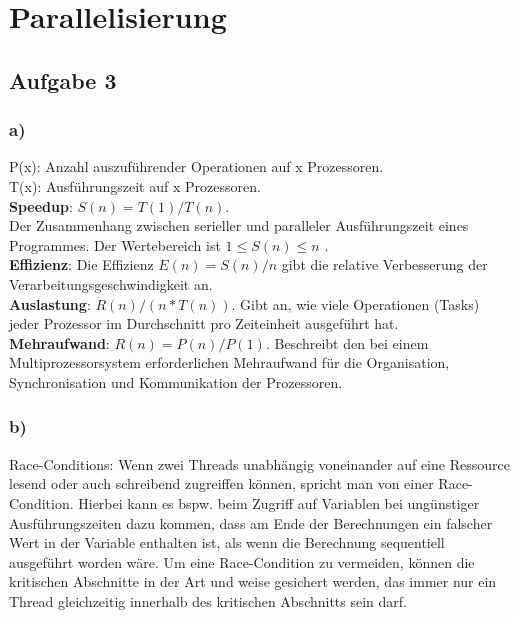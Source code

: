 \documentclass{report}
\begin{document}
\section{Parallelisierung}
    \subsection{Aufgabe 3}
    
        \subsubsection{a)}
        P(x): Anzahl auszuführender Operationen auf x Prozessoren.\\
        T(x): Ausführungszeit auf x Prozessoren.\\
        
        \textbf{Speedup}:  $S(n) = T(1)/T(n) $. \\ Der Zusammenhang zwischen serieller und paralleler Ausführungszeit eines Programmes. Der Wertebereich ist $ 1 \leq S(n) \leq n $ .\\
        
        \textbf{Effizienz}: Die Effizienz $ E(n) = S(n)/n $ gibt die relative Verbesserung der Verarbeitungsgeschwindigkeit an.\\
        
        \textbf{Auslastung}: $ R(n)/(n*T(n)) $. Gibt an, wie viele Operationen (Tasks) jeder Prozessor im Durchschnitt pro Zeiteinheit ausgeführt hat.\\
        
        \textbf{Mehraufwand}: $ R(n) = P(n)/P(1) $. Beschreibt den bei einem Multiprozessorsystem erforderlichen Mehraufwand für die Organisation, Synchronisation und Kommunikation der Prozessoren.\\
        
        \subsubsection{b)}
        Race-Conditions: Wenn zwei Threads unabhängig voneinander auf eine Ressource lesend oder auch schreibend zugreiffen können, 
        spricht man von einer Race-Condition. Hierbei kann es bspw. beim Zugriff auf Variablen bei ungünstiger Ausführungszeiten
        dazu kommen, dass am Ende der Berechnungen ein falscher Wert in der Variable enthalten ist, als wenn die Berechnung sequentiell 
        ausgeführt worden wäre.
        Um eine Race-Condition zu vermeiden, können die kritischen Abschnitte in der Art und weise gesichert werden, das immer nur ein 
        Thread gleichzeitig innerhalb des kritischen Abschnitts sein darf.
\end{document}
